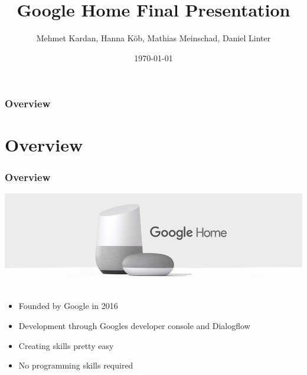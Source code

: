 \documentclass{beamer}
\title[Google Home]{Google Home Final Presentation} %
\author{Mehmet Kardan, Hanna Köb, Mathias Meinschad, Daniel Linter} %
\institute[UCLA] %
{
University of Innsbruck - SIT \\ %
}
\date{\today} %
\begin{document}
\begin{frame}
\titlepage %
\end{frame}

\begin{frame}
\frametitle{Overview} %
\tableofcontents %
\end{frame}


\section{Overview}

\begin{frame}
\frametitle{Overview}
\begin{center}
\includegraphics[scale=0.35]{pictures/google-home.png} 
\end{center}
\begin{itemize}
\item Founded by Google in 2016
\item Development through Googles developer console and Dialogflow
\item Creating skills pretty easy
\item No programming skills required
\end{itemize}
\end{frame}
\end{document}
